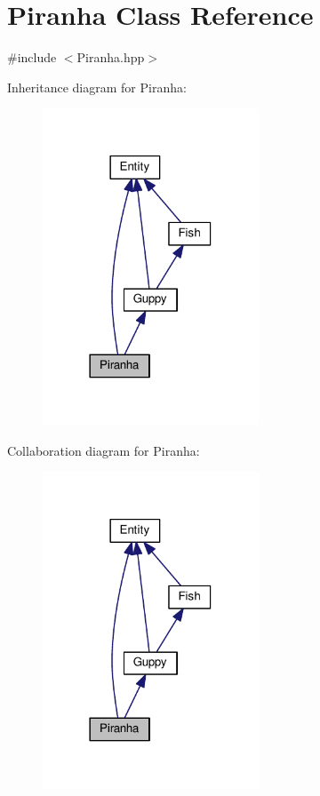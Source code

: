 \hypertarget{classPiranha}{}\section{Piranha Class Reference}
\label{classPiranha}


{\ttfamily \#include $<$Piranha.\+hpp$>$}



Inheritance diagram for Piranha\+:\nopagebreak
\begin{figure}[H]
\begin{center}
\leavevmode
\includegraphics[width=182pt]{classPiranha__inherit__graph}
\end{center}
\end{figure}


Collaboration diagram for Piranha\+:\nopagebreak
\begin{figure}[H]
\begin{center}
\leavevmode
\includegraphics[width=182pt]{classPiranha__coll__graph}
\end{center}
\end{figure}
